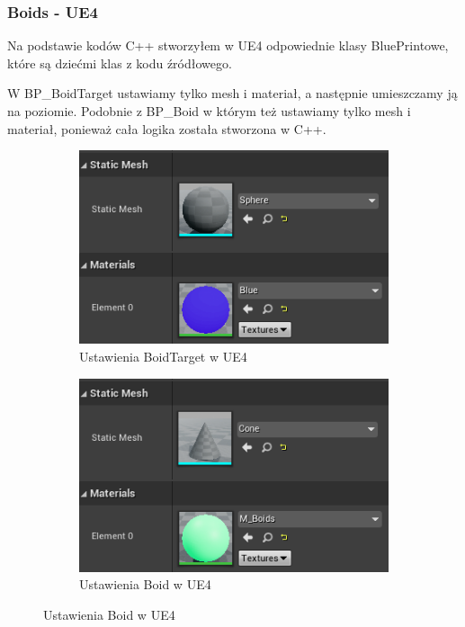 \documentclass[a4paper,12pt,reqno]{article}
\begin{document}


\subsubsection{Boids - UE4}

Na podstawie kodów C++ stworzyłem w UE4 odpowiednie klasy BluePrintowe, które są dziećmi klas z kodu źródłowego. 

W BP\_BoidTarget ustawiamy tylko mesh i materiał, a następnie umieszczamy ją na poziomie. Podobnie z BP\_Boid w którym też ustawiamy tylko mesh i materiał, ponieważ cała logika została stworzona w C++.

\begin{figure}[H]%
	\centering
	\begin{subfigure}{.5\textwidth}
		\centering
		\includegraphics[width=0.8\linewidth]{graphics//boids/BP_BoidTarget.png}
		\caption{Ustawienia BoidTarget w UE4 }	
		\label{ref:subref_a}
	\end{subfigure}%
	\begin{subfigure}{.5\textwidth}
		\centering
		\includegraphics[width=0.8\linewidth]{graphics//boids/BP_Boid.png}
		\caption{Ustawienia Boid w UE4 }
		\label{ref:subref_b}
	\end{subfigure}%
\label{ref:ref}
\end{figure}
\end{document}
